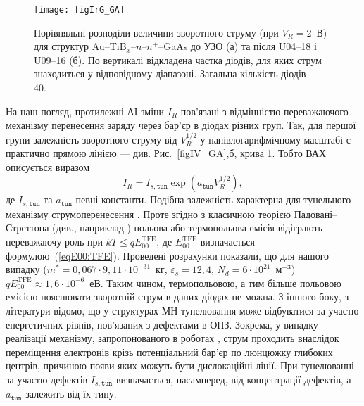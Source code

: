 \documentclass[a4paper,14pt,oneside,openany]{memoir}
\begin{document}
\begin{figure}
\center
\texttt{[image: figIrG\_GA]}%
\caption{\label{figIrG_GA}
Порівняльні розподіли величини зворотного струму (при $V_R=2$~В)
для структур Au--TiB$_x$--$n$--$n^+$--GaAs до УЗО (а) та після U04--18 і U09--16 (б).
По вертикалі відкладена частка діодів, для яких струм знаходиться у відповідному діапазоні.
Загальна кількість діодів --- 40.
}
\end{figure}


На наш погляд, протилежні АІ зміни $I_R$ пов’язані з відмінністю переважаючого механізму перенесення заряду через бар'єр в діодах різних груп.
Так, для першої групи залежність зворотного струму від $V_R^{1/2}$ у напівлогарифмічному масштабі є практично прямою лінією --- див. Рис.~\ref{figIV_GA},б, крива 1.
Тобто ВАХ описується виразом
\begin{equation}\label{eqIR1:GA}
I_R=I_{s,\mathtt{tun}}\exp\left(a_\mathtt{tun}V_R^{1/2}\right),
\end{equation}
де
$I_{s,\mathtt{tun}}$ та $a_\mathtt{tun}$ певні константи.
Подібна залежність характерна для тунельного механізму струмоперенесення \cite{Rhoderick1988}.
Проте згідно з класичною теорією Падовані--Стреттона (див., наприклад \cite{Rhoderick1988,Singh1994}) польова або термопольова емісія відіграють
переважаючу роль при $kT\leq qE_{00}^\mathrm{TFE}$,
де $E_{00}^\mathrm{TFE}$ визначається формулою~(\ref{eqE00:TFE}).
Проведені розрахунки показали, що для нашого випадку ($m^*=0,067\cdot9,11\cdot10^{-31}$~кг,
$\varepsilon_s=12,4$, $N_d=6\cdot10^{21}$~м$^{-3}$) $qE_{00}^\mathrm{TFE}\approx1,6\cdot10^{-6}$~еВ.
Таким чином, термопольовою, а тим більше польовою емісією пояснювати зворотній струм в даних діодах не можна.
З іншого боку, з літератури \cite{Evstropov,Evstropov2000,Ganichev:2000,PipinsFTP,Pipinys1999} відомо, що у структурах МН тунелювання може відбуватися за участю енергетичних рівнів, пов'язаних з дефектами в ОПЗ.
Зокрема, у випадку реалізації механізму, запропонованого в роботах \cite{Evstropov,Evstropov2000}, струм проходить внаслідок переміщення електронів
крізь потенціальний бар'єр по люнцюжку глибоких центрів, причиною появи яких можуть бути дислокаційні лінії.
При тунелюванні за участю дефектів $I_{s,\mathtt{tun}}$ визначається, насамперед, від концентрації дефектів,
а $a_\mathtt{tun}$ залежить від їх типу.
\end{document}
